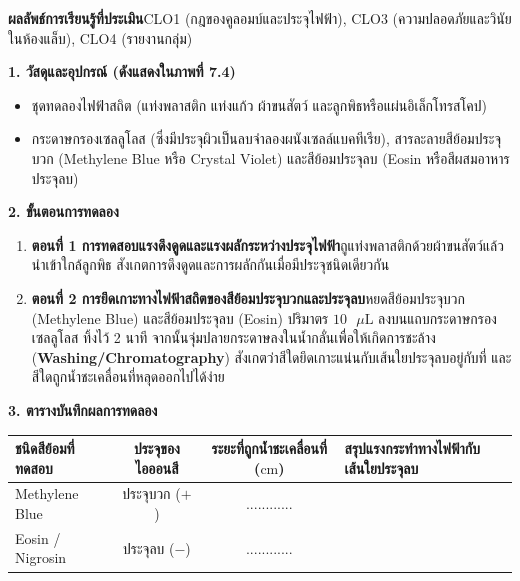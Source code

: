 \begin{labbox}
\noindent\textbf{ผลลัพธ์การเรียนรู้ที่ประเมิน}\quad CLO1 (กฎของคูลอมบ์และประจุไฟฟ้า), CLO3 (ความปลอดภัยและวินัยในห้องแล็บ), CLO4 (รายงานกลุ่ม)

\vspace{4pt}
\noindent\textbf{1. วัสดุและอุปกรณ์ (ดังแสดงใน\mbox{ภาพที่} 7.4)}
\begin{itemize}
    \item ชุดทดลองไฟฟ้าสถิต (แท่งพลาสติก แท่งแก้ว ผ้าขนสัตว์ และลูกพิธหรือแผ่นอิเล็กโทรสโคป)
    \item กระดาษกรองเซลลูโลส (ซึ่งมีประจุผิวเป็นลบจำลองผนังเซลล์แบคทีเรีย), สารละลายสีย้อมประจุบวก (Methylene Blue หรือ Crystal Violet) และสีย้อมประจุลบ (Eosin หรือสีผสมอาหารประจุลบ)
\end{itemize}

\noindent\textbf{2. ขั้นตอนการทดลอง}
\begin{enumerate}
    \item \textbf{ตอนที่ 1 การทดสอบแรงดึงดูดและแรงผลักระหว่างประจุไฟฟ้า}\quad ถูแท่งพลาสติกด้วยผ้าขนสัตว์แล้วนำเข้าใกล้ลูกพิธ สังเกตการดึงดูดและการผลักกันเมื่อมีประจุชนิดเดียวกัน
    \item \textbf{ตอนที่ 2 การยึดเกาะทางไฟฟ้าสถิตของสีย้อมประจุบวกและประจุลบ}\quad หยดสีย้อมประจุบวก (Methylene Blue) และสีย้อมประจุลบ (Eosin) ปริมาตร $10\text{ }\mu\text{L}$ ลงบนแถบกระดาษกรองเซลลูโลส ทิ้งไว้ 2 นาที จากนั้นจุ่มปลายกระดาษลงในน้ำกลั่นเพื่อให้เกิดการชะล้าง (\textbf{Washing/Chromatography}) สังเกตว่าสีใดยึดเกาะแน่นกับเส้นใยประจุลบอยู่กับที่ และสีใดถูกน้ำชะเคลื่อนที่หลุดออกไปได้ง่าย
\end{enumerate}

\noindent\textbf{3. ตารางบันทึกผลการทดลอง}
\begin{center}
\footnotesize\setlength{\tabcolsep}{3.5pt}
\begin{tabularx}{\linewidth}{>{\raggedright\arraybackslash}X c c >{\raggedright\arraybackslash}X}
\toprule
\textbf{ชนิดสีย้อมที่ทดสอบ} & \textbf{ประจุของไอออนสี} & \textbf{ระยะที่ถูกน้ำชะเคลื่อนที่ ($\text{cm}$)} & \textbf{สรุปแรงกระทำทางไฟฟ้ากับเส้นใยประจุลบ} \\
\midrule
Methylene Blue & ประจุบวก ($+$) & ............ & \dotfill \\
Eosin / Nigrosin & ประจุลบ ($-$) & ............ & \dotfill \\
\bottomrule
\end{tabularx}
\end{center}
\end{labbox}

